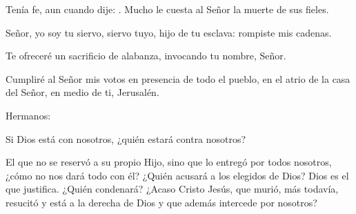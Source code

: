 
 


\begin{psbody}
Tenía fe, aun cuando dije:
.
Mucho le cuesta al Señor
la muerte de sus fieles. 

Señor, yo soy tu siervo,
siervo tuyo, hijo de tu esclava:
rompiste mis cadenas.

Te ofreceré un sacrificio de alabanza,
invocando tu nombre, Señor. 

Cumpliré al Señor mis votos
en presencia de todo el pueblo,
en el atrio de la casa del Señor,
en medio de ti, Jerusalén. 
\end{psbody}


 


\begin{scripture}
Hermanos:

Si Dios está con nosotros, ¿quién estará contra nosotros?

El que no se reservó a su propio Hijo, sino que lo entregó por todos nosotros, ¿cómo no nos dará todo con él? ¿Quién acusará a los elegidos de Dios? Dios es el que justifica. ¿Quién condenará? ¿Acaso Cristo Jesús, que murió, más todavía, resucitó y está a la derecha de Dios y que además intercede por nosotros?
\end{scripture}


 


